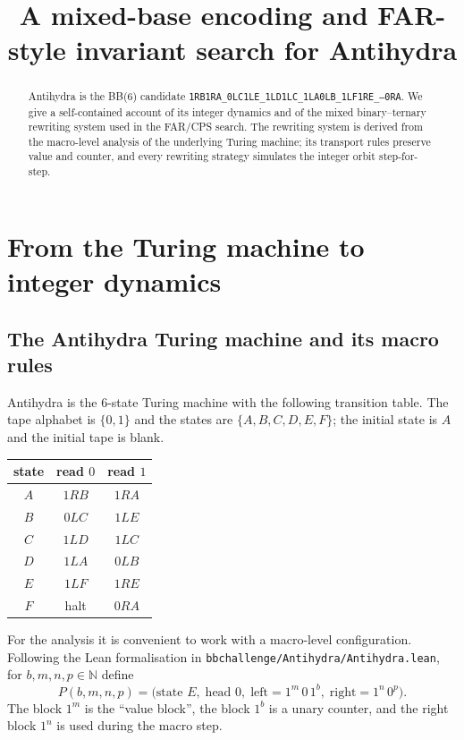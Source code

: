 \documentclass[11pt,a4paper]{article}
\title{A mixed-base encoding and FAR-style invariant search for Antihydra}
\author{}
\date{}
\theoremstyle{definition}
\newcommand{\Nat}{\mathbb{N}}
\newcommand{\ones}[1]{1^{#1}}
\newcommand{\zeros}[1]{0^{#1}}
\begin{document}
\maketitle

\begin{abstract}
  Antihydra is the BB(6) candidate
  \texttt{1RB1RA\_0LC1LE\_1LD1LC\_1LA0LB\_1LF1RE\_---0RA}.
  We give a self-contained account of its integer dynamics and of the
  mixed binary--ternary rewriting system used in the FAR/CPS search.
  The rewriting system is derived from the macro-level analysis of the
  underlying Turing machine; its transport rules preserve value and
  counter, and every rewriting strategy simulates the integer orbit
  step-for-step.
\end{abstract}

\section{From the Turing machine to integer dynamics}
\label{sec:dynamics}

\subsection{The Antihydra Turing machine and its macro rules}
\label{subsec:macro}

Antihydra is the 6-state Turing machine with the following transition
 table.  The tape alphabet is $\{0,1\}$ and the states are
$\{A,B,C,D,E,F\}$; the initial state is $A$ and the initial tape is
blank.

\begin{center}
\begin{tabular}{c|cc}
  \toprule
  state & read $0$ & read $1$ \\
  \midrule
  $A$ & $1RB$ & $1RA$ \\
  $B$ & $0LC$ & $1LE$ \\
  $C$ & $1LD$ & $1LC$ \\
  $D$ & $1LA$ & $0LB$ \\
  $E$ & $1LF$ & $1RE$ \\
  $F$ & halt  & $0RA$ \\
  \bottomrule
\end{tabular}
\end{center}

For the analysis it is convenient to work with a macro-level
configuration.  Following the Lean formalisation in
\texttt{bbchallenge/Antihydra/Antihydra.lean}, for
$b,m,n,p\in\Nat$ define
\begin{equation}
  \label{eq:macro-config}
  P(b,m,n,p)
  =
  \bigl(\text{state }E,\;\text{head }0,\;
  \text{left}=\ones{m}\,0\,\ones{b},\;
  \text{right}=\ones{n}\,\zeros{p}\bigr).
\end{equation}
The block $\ones{m}$ is the ``value block'', the block $\ones{b}$ is
a unary counter, and the right block $\ones{n}$ is used during the
macro step.
\end{document}

